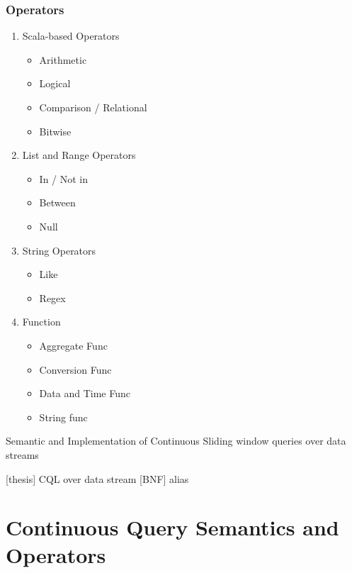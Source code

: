 \subsubsection{Operators}
\begin{enumerate}

\item Scala-based Operators
	\begin{itemize}
        \item Arithmetic
        \item Logical
        \item Comparison / Relational
        \item Bitwise
	\end{itemize}
	
 \item List and Range Operators
 	\begin{itemize}
        \item In / Not in
        \item Between
        \item Null
 	\end{itemize}
 \item String Operators
 	\begin{itemize}
        \item Like
        \item Regex
 	\end{itemize}
 \item Function 
 	\begin{itemize}
        \item Aggregate Func
        \item Conversion Func
       	\item Data and Time Func
        \item String func
 	\end{itemize}

\end{enumerate}
Semantic and Implementation of Continuous Sliding window queries over data streams

[thesis] CQL over data stream [BNF] alias



\section{Continuous Query Semantics and Operators} \label{semantic}


